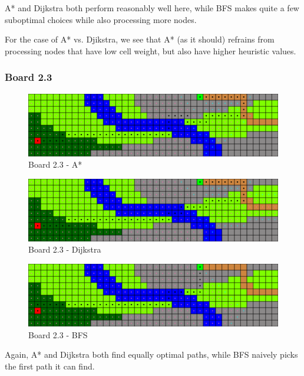 A* and Dijkstra both perform reasonably well here, while BFS makes quite a few
suboptimal choices while also processing more nodes.

For the case of A* vs. Djikstra, we see that A* (as it should) refrains from
processing nodes that have low cell weight, but also have higher heuristic values.

\clearpage

\subsubsection*{Board 2.3}

\begin{figure}[h!]
  \centering
    \includegraphics[width=\textwidth]{img/board-2-3-astar}
    \caption{Board 2.3 - A*}
\end{figure}

\begin{figure}[h!]
  \centering
    \includegraphics[width=\textwidth]{img/board-2-3-dijkstra}
    \caption{Board 2.3 - Dijkstra}
\end{figure}

\begin{figure}[h!]
  \centering
    \includegraphics[width=\textwidth]{img/board-2-3-bfs}
    \caption{Board 2.3 - BFS}
\end{figure}

Again, A* and Dijkstra both find equally optimal paths, while BFS naively picks
the first path it can find.

